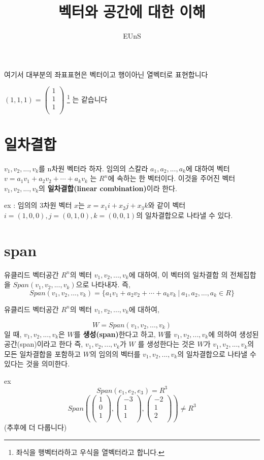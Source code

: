 \documentclass{oblivoir}
\title{벡터와 공간에 대한 이해}
\author{EUnS}
\newcommand{\onetok}[1]{ {#1}_1, {#1}_2, ... , {#1}_k}
\newcommand{\sumtok}[2]{  {#1}_1{#2}_1 + {#1}_2{#2}_2 + \cdots + {#1}_k{#2}_k}
\newcommand{\cvecthree}[3]{ \begin{pmatrix}    {#1} \\    {#2} \\    {#3} \\ \end{pmatrix}}
\begin{document}
    
\maketitle

여기서 대부분의 좌표표현은 벡터이고 행이아닌 열벡터로 표현합니다

$ (1, 1, 1)  =  \cvecthree{1}{1}{1} $ \footnote{ 좌식을 행벡터라하고 우식을 열벡터라고 합니다.}
는 같습니다

\section{일차결합}
\begin{dfn}[일차결합]
    $\onetok{v}$를 n차원 벡터라 하자. 임의의 스칼라 $\onetok{a}$에 대하여
    벡터 $v = \sumtok{a}{v}$ 는 $R^n$에 속하는 한 벡터이다. 이것을 주어진 벡터 $\onetok{v}$의 \textbf{일차결합(linear combination)}이라 한다.   
\end{dfn}

ex : 임의의 3차원 벡터 $x$는 $x = x_1i + x_2j + x_3k$와 같이 벡터 $ i = (1,0,0) , j = (0,1,0), k = (0,0,1)$의 일차결합으로 나타낼 수 있다.

\reversemarginpar
{}




\section {span}


\begin{dfn}[span]
    
유클리드 벡터공간 $R^n$의 벡터 $\onetok{v}$에 대하여, 이 벡터의 일차결합 의 전체집합을 $Span(\onetok{v})$으로 나타내자. 즉,
\[
    Span(\onetok{v}) =\{ \sumtok{a}{v} \:|\: \onetok{a} \in R\}
\]

유클리드 벡터공간 $R^n$의 벡터 $\onetok{v}$에 대하여,

\[
    W = Span(\onetok{v})
\]
일 때, $\onetok{v}$은 $W$를 \textbf{생성(span)}한다고 하고, $W$를 $\onetok{v}$에 의하여 생성된 공간(span)이라고 한다 즉, $\onetok{v}$가 $W$ 를 생성한다는 것은  $W$가 $\onetok{v}$의 모든 일차결합을 포함하고 $W$의 임의의 벡터를 $\onetok{v}$의 일차결합으로 나타낼 수 있다는 것을 의미한다.
\end{dfn}

ex
\[
    Span(e_1, e_2, e_3) = R^3
\]
\[
    Span ( \cvecthree{1}{0}{1},\cvecthree{-3}{1}{1},\cvecthree{-2}{1}{2}) \neq R^3
\]
 (추후에 더 다룹니다)
\end{document}
